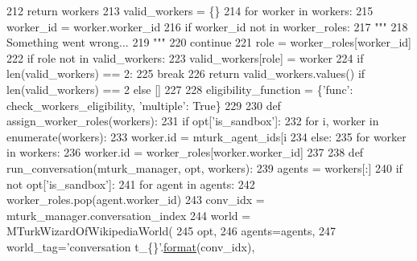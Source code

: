 \begin{DoxyCode}
212                 \textcolor{keywordflow}{return} workers
213             valid\_workers = \{\}
214             \textcolor{keywordflow}{for} worker \textcolor{keywordflow}{in} workers:
215                 worker\_id = worker.worker\_id
216                 \textcolor{keywordflow}{if} worker\_id \textcolor{keywordflow}{not} \textcolor{keywordflow}{in} worker\_roles:
217                     \textcolor{stringliteral}{"""}
218 \textcolor{stringliteral}{                    Something went wrong...}
219 \textcolor{stringliteral}{                    """}
220                     \textcolor{keywordflow}{continue}
221                 role = worker\_roles[worker\_id]
222                 \textcolor{keywordflow}{if} role \textcolor{keywordflow}{not} \textcolor{keywordflow}{in} valid\_workers:
223                     valid\_workers[role] = worker
224                 \textcolor{keywordflow}{if} len(valid\_workers) == 2:
225                     \textcolor{keywordflow}{break}
226             \textcolor{keywordflow}{return} valid\_workers.values() \textcolor{keywordflow}{if} len(valid\_workers) == 2 \textcolor{keywordflow}{else} []
227 
228         eligibility\_function = \{\textcolor{stringliteral}{'func'}: check\_workers\_eligibility, \textcolor{stringliteral}{'multiple'}: \textcolor{keyword}{True}\}
229 
230         \textcolor{keyword}{def }assign\_worker\_roles(workers):
231             \textcolor{keywordflow}{if} opt[\textcolor{stringliteral}{'is\_sandbox'}]:
232                 \textcolor{keywordflow}{for} i, worker \textcolor{keywordflow}{in} enumerate(workers):
233                     worker.id = mturk\_agent\_ids[i %
234             \textcolor{keywordflow}{else}:
235                 \textcolor{keywordflow}{for} worker \textcolor{keywordflow}{in} workers:
236                     worker.id = worker\_roles[worker.worker\_id]
237 
238         \textcolor{keyword}{def }run\_conversation(mturk\_manager, opt, workers):
239             agents = workers[:]
240             \textcolor{keywordflow}{if} \textcolor{keywordflow}{not} opt[\textcolor{stringliteral}{'is\_sandbox'}]:
241                 \textcolor{keywordflow}{for} agent \textcolor{keywordflow}{in} agents:
242                     worker\_roles.pop(agent.worker\_id)
243             conv\_idx = mturk\_manager.conversation\_index
244             world = MTurkWizardOfWikipediaWorld(
245                 opt,
246                 agents=agents,
247                 world\_tag=\textcolor{stringliteral}{'conversation t\_\{\}'}.\hyperlink{namespaceparlai_1_1chat__service_1_1services_1_1messenger_1_1shared__utils_a32e2e2022b824fbaf80c747160b52a76}{format}(conv\_idx),

\end{DoxyCode}
